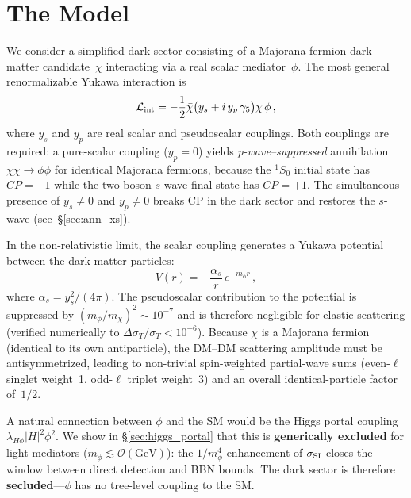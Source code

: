 \documentclass[aps,prd,twocolumn,superscriptaddress,nofootinbib]{revtex4-2}
\newcommand{\mchi}{m_\chi}
\newcommand{\mphi}{m_\phi}
\newcommand{\siSI}{\sigma_{\rm SI}}
\begin{document}
\section{The Model}\label{sec:model}

We consider a simplified dark sector consisting of a Majorana fermion
dark matter candidate~$\chi$ interacting via a real scalar
mediator~$\phi$.  The most general renormalizable Yukawa
interaction is~\cite{Kahlhoefer:2017umn}
\begin{equation}\label{eq:lagrangian}
  \mathcal{L}_{\rm int}
  = -\frac{1}{2}\bar\chi\bigl(y_s + i\,y_p\,\gamma_5\bigr)\chi\,\phi\,,
\end{equation}
where $y_s$ and $y_p$ are real scalar and pseudoscalar couplings.
Both couplings are required: a pure-scalar coupling ($y_p=0$)
yields \emph{p-wave--suppressed} annihilation $\chi\chi\to\phi\phi$
for identical Majorana fermions, because the ${}^{1}S_{0}$ initial
state has $CP=-1$ while the two-boson $s$-wave final state has
$CP=+1$.  The simultaneous presence of $y_s\neq 0$ and $y_p\neq 0$
breaks CP in the dark sector and restores the $s$-wave
(see~\S\ref{sec:ann_xs}).

In the non-relativistic limit, the scalar coupling generates a
Yukawa potential between the dark matter particles:
\begin{equation}\label{eq:yukawa}
  V(r) = -\frac{\alpha_s}{r}\,e^{-\mphi r}\,,
\end{equation}
where $\alpha_s = y_s^{2}/(4\pi)$.  The pseudoscalar contribution
to the potential is suppressed by $(\mphi/\mchi)^{2}\sim 10^{-7}$
and is therefore negligible for elastic scattering (verified
numerically to $\Delta\sigma_T/\sigma_T < 10^{-6}$).
Because $\chi$ is a Majorana fermion
(identical to its own antiparticle), the DM--DM scattering amplitude
must be antisymmetrized, leading to non-trivial spin-weighted
partial-wave sums (even-$\ell$ singlet weight~1, odd-$\ell$ triplet
weight~3) and an overall identical-particle factor of~$1/2$.

A natural connection between $\phi$ and the SM would be the Higgs
portal coupling $\lambda_{H\phi}|H|^{2}\phi^{2}$.  We show in
\S\ref{sec:higgs_portal} that this is \textbf{generically excluded}
for light mediators ($\mphi\lesssim\mathcal{O}(\text{GeV})$): the
$1/\mphi^{4}$ enhancement of $\siSI$ closes the window between direct
detection and BBN bounds.  The dark sector is therefore
\textbf{secluded}---$\phi$ has no tree-level coupling to the SM.
\end{document}
